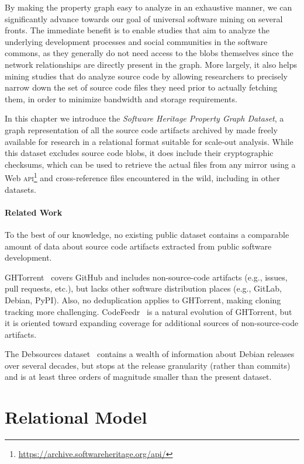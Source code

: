 By making the property graph easy to analyze in an exhaustive manner, we can
significantly advance towards our goal of universal software mining on several
fronts. The immediate benefit is to enable studies that aim to analyze the
underlying development processes and social communities in the software
commons, as they generally do not need access to the blobs themselves since the
network relationships are directly present in the graph. More largely, it also
helps mining studies that do analyze source code by allowing researchers to
precisely narrow down the set of source code files they need prior to actually
fetching them, in order to minimize bandwidth and storage requirements.

In this chapter we introduce the \emph{Software Heritage Property Graph
Dataset}, a graph representation of all the source code artifacts archived by
\SWH{} made freely available for research in a relational format suitable for
scale-out analysis.
While this dataset excludes source code blobs, it does include their
cryptographic checksums, which can be used to retrieve the actual files from
any \SWH{} mirror using a Web
\textsc{api}\footnote{\url{https://archive.softwareheritage.org/api/}} and
cross-reference files encountered in the wild, including in other datasets.

\paragraph*{Related Work}

To the best of our knowledge, no existing public dataset contains a comparable
amount of data about source code artifacts extracted from public software
development.

GHTorrent~\cite{GHTorrent} covers GitHub and includes
non-source-code artifacts (e.g., issues, pull requests, etc.), but lacks other
software distribution places (e.g., GitLab, Debian, PyPI). Also, no
deduplication applies to GHTorrent, making cloning tracking more challenging.
CodeFeedr~\cite{DBLP:conf/icse/VargasHKBG18} is a natural evolution of
GHTorrent, but it is oriented toward expanding coverage for additional sources
of non-source-code artifacts.

The Debsources dataset~\cite{debsources-ese-2016} contains a wealth of
information about Debian releases over several decades, but stops at the
release granularity (rather than commits) and is at least three orders of
magnitude smaller than the present dataset.

\section{Relational Model}

